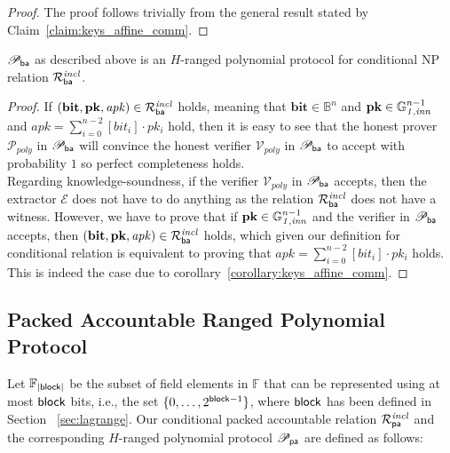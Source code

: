 \begin{proof}The proof follows trivially from the general result stated by Claim~\ref{claim:keys_affine_comm}. 
\end{proof}

\begin{lemma} 
\label{le:ba}
$\mathscr{P}_{\mathsf{ba}}$ as described above is an $H$-ranged polynomial 
protocol for conditional NP relation $\mathcal{R}^{\mathit{incl}}_{\mathsf{ba}}$.
\end{lemma}

\begin{proof}
If $(\mathbf{bit},\mathbf{pk}, \mathit{apk}) \in \mathcal{R}^{\mathit{incl}}_{\mathsf{ba}}$ holds, 
meaning that $\mathbf{bit} \in \mathbb{B}^n$ and $\mathbf{pk} \in \mathbb{G}_{\mathit{1,inn}}^{n-1}$ and $\mathit{apk} = \sum_{i=0}^{n-2} [\mathit{bit_i}] \cdot \mathit{pk_i}$ hold, 
then it is easy to see that the honest prover $\mathcal{P}_{poly}$ in $\mathscr{P}_{\mathsf{ba}}$ will convince the honest verifier $\mathcal{V}_{poly}$ in 
$\mathscr{P}_{\mathsf{ba}}$ to accept with probability $1$ so perfect completeness holds. \\
Regarding knowledge-soundness, if the verifier $\mathcal{V}_{poly}$ in $\mathscr{P}_{\mathsf{ba}}$ accepts, 
then the extractor $\mathcal{E}$ does not have to do anything as the relation $\mathcal{R}^{\mathit{incl}}_{\mathsf{ba}}$ does not have a witness.  
However, we have to prove that if $\mathbf{pk} \in \mathbb{G}_{\mathit{1,inn}}^{n-1}$ and the verifier in $\mathscr{P}_{\mathsf{ba}}$ accepts, 
then $(\mathbf{bit},\mathbf{pk}, \mathit{apk}) \in \mathcal{R}^{\mathit{incl}}_{\mathsf{ba}}$ holds, which given our definition for conditional relation is 
equivalent to proving that $\mathit{apk} = \sum_{i=0}^{n-2} [\mathit{bit_i}] \cdot \mathit{pk_i}$ holds. This is indeed the case due to 
corollary~\ref{corollary:keys_affine_comm}.

\end{proof}
\subsection{Packed Accountable Ranged Polynomial Protocol}
\label{sec_a}
Let $\mathbb{F}_{|\mathsf{block}|}$ be the subset of field elements in $\mathbb{F}$ that can be represented using at 
most $\mathsf{block}$ bits, i.e., the set $\{0, \ldots, 2^{\mathsf{block} -1} \}$, where $\mathsf{block}$ has been defined in Section ~\ref{sec:lagrange}. 
Our conditional packed accountable relation $\mathcal{R}^{\mathit{incl}}_{\mathsf{pa}}$ and the corresponding $H$-ranged polynomial protocol 
$\mathscr{P}_{\mathsf{pa}}$ are defined as follows:\\
 

